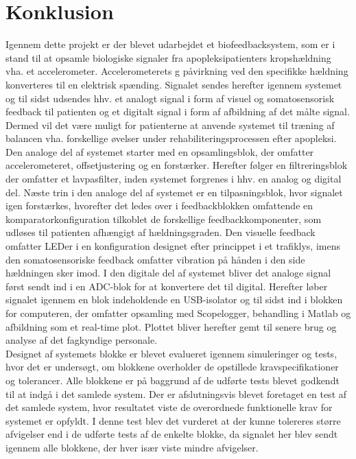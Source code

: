 \section{Konklusion}
Igennem dette projekt er der blevet udarbejdet et biofeedbacksystem, som er i stand til at opsamle biologiske signaler fra apopleksipatienters kropshældning vha. et accelerometer. Accelerometerets g påvirkning ved den specifikke hældning konverteres til en elektrisk spænding. Signalet sendes herefter igennem systemet og til sidst udsendes hhv. et analogt signal i form af visuel og somatosensorisk feedback til patienten og et digitalt signal i form af afbildning af det målte signal. Dermed vil det være muligt for patienterne at anvende systemet til træning af balancen vha. forskellige øvelser under rehabiliteringsprocessen efter apopleksi.  
 \\
Den analoge del af systemet starter med en opsamlingsblok, der omfatter accelerometeret, offsetjustering og en forstærker. Herefter følger en filtreringsblok der omfatter et lavpasfilter, inden systemet forgrenes i hhv. en analog og digital del. Næste trin i den analoge del af systemet er en tilpasningsblok, hvor signalet igen forstærkes, hvorefter det ledes over i feedbackblokken omfattende en komparatorkonfiguration tilkoblet de forskellige feedbackkomponenter, som udløses til patienten afhængigt af hældningsgraden. Den visuelle feedback omfatter LEDer i en konfiguration designet efter princippet i et trafiklys, imens den somatosensoriske feedback omfatter vibration på hånden i den side hældningen sker imod. 
I den digitale del af systemet bliver det analoge signal først sendt ind i en ADC-blok for at konvertere det til digital. Herefter løber signalet igennem en blok indeholdende en USB-isolator og til sidst ind i blokken for computeren, der omfatter opsamling med Scopelogger, behandling i Matlab og afbildning som et real-time plot. Plottet bliver herefter gemt til senere brug og analyse af det fagkyndige personale. \\
Designet af systemets blokke er blevet evalueret igennem simuleringer og tests, hvor det er undersøgt, om blokkene overholder de opstillede kravspecifikationer og tolerancer. Alle blokkene er på baggrund af de udførte tests blevet godkendt til at indgå i det samlede system. Der er afslutningsvis blevet foretaget en test af det samlede system, hvor resultatet viste de overordnede funktionelle krav for systemet er opfyldt. I denne test blev det vurderet at der kunne tolereres større afvigelser end i de udførte tests af de enkelte blokke, da signalet her blev sendt igennem alle blokkene, der hver især viste mindre afvigelser.  


\clearpage
